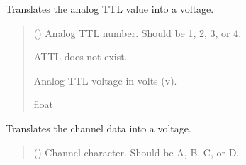\documentclass[letterpaper,10pt,english]{sphinxmanual}
\begin{document}
\begin{fulllineitems}
\begin{fulllineitems}
\end{fulllineitems}


\begin{fulllineitems}
\label{\detokenize{Morelia.Packets:Morelia.Packets.Binary5.PacketBinary5.AnalogTTL}}
\pysigstartsignatures
{}
\pysigstopsignatures
\sphinxAtStartPar
Translates the analog TTL value into a voltage.
\begin{quote}\begin{description}
\sphinxAtStartPar
{} () \textendash{} Analog TTL number. Should be 1, 2, 3, or 4.

\sphinxAtStartPar
{} \textendash{} ATTL does not exist.

\sphinxAtStartPar
Analog TTL voltage in volts (v).

\sphinxAtStartPar
float

\end{description}\end{quote}

\end{fulllineitems}


\begin{fulllineitems}
\label{\detokenize{Morelia.Packets:Morelia.Packets.Binary5.PacketBinary5.Channel}}
\pysigstartsignatures
{}
\pysigstopsignatures
\sphinxAtStartPar
Translates the channel data into a voltage.
\begin{quote}\begin{description}
\sphinxAtStartPar
{} () \textendash{} Channel character. Should be A, B, C, or D.


\end{description}
\end{quote}
\end{fulllineitems}
\end{fulllineitems}
\end{document}

